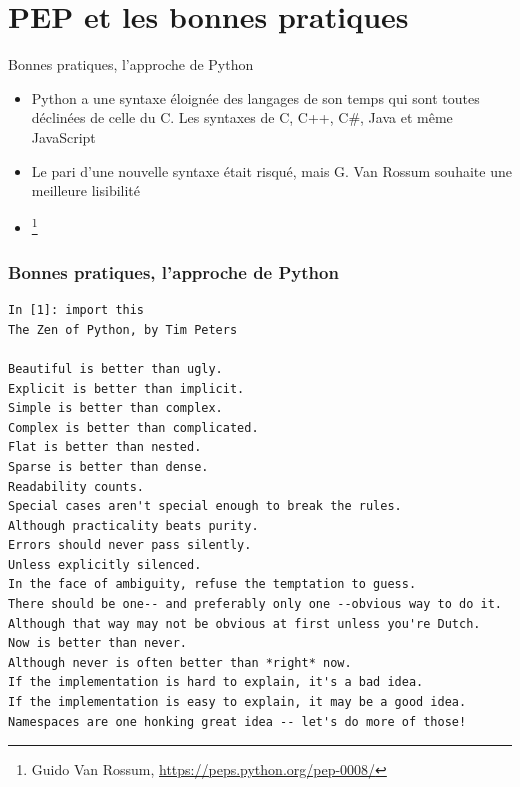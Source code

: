 \documentclass{beamer}
\begin{document}
    \section{PEP et les bonnes pratiques}\label{sec:pep-good-pratices}

    \begin{frame}{Bonnes pratiques, l'approche de Python}
        \begin{itemize}
            \item Python a une syntaxe éloignée des langages de son temps qui sont toutes déclinées de celle du C. Les syntaxes de C, C++, C\#, Java et même JavaScript
            \item Le pari d'une nouvelle syntaxe était risqué, mais G. Van Rossum souhaite une meilleure lisibilité
            \item {}\footnote{Guido Van Rossum, \url{https://peps.python.org/pep-0008/}}
        \end{itemize}
    \end{frame}

    \begin{frame}[fragile]
        \transdissolve
        \frametitle{Bonnes pratiques, l'approche de Python}
        \begin{lstlisting}
In [1]: import this
The Zen of Python, by Tim Peters

Beautiful is better than ugly.
Explicit is better than implicit.
Simple is better than complex.
Complex is better than complicated.
Flat is better than nested.
Sparse is better than dense.
Readability counts.
Special cases aren't special enough to break the rules.
Although practicality beats purity.
Errors should never pass silently.
Unless explicitly silenced.
In the face of ambiguity, refuse the temptation to guess.
There should be one-- and preferably only one --obvious way to do it.
Although that way may not be obvious at first unless you're Dutch.
Now is better than never.
Although never is often better than *right* now.
If the implementation is hard to explain, it's a bad idea.
If the implementation is easy to explain, it may be a good idea.
Namespaces are one honking great idea -- let's do more of those!
        \end{lstlisting}
    \end{frame}
\end{document}

